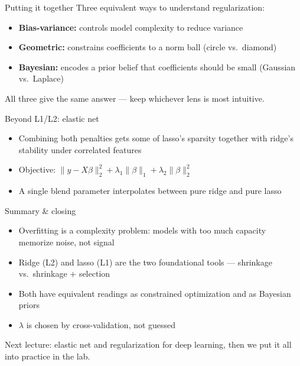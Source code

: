 \documentclass[aspectratio=169, 10pt]{beamer}
\begin{document}
\begin{frame}{Putting it together}
  Three equivalent ways to understand regularization:
  \begin{itemize}
    \item \textbf{Bias-variance:} controls model complexity to reduce variance
    \item \textbf{Geometric:} constrains coefficients to a norm ball (circle vs.\ diamond)
    \item \textbf{Bayesian:} encodes a prior belief that coefficients should be small (Gaussian vs.\ Laplace)
  \end{itemize}
  All three give the same answer --- keep whichever lens is most intuitive.
\end{frame}

\begin{frame}{Beyond L1/L2: elastic net}
  \begin{itemize}
    \item Combining both penalties gets some of lasso's sparsity together with ridge's stability under correlated features
    \item Objective: $\|y - X\beta\|_2^2 + \lambda_1 \|\beta\|_1 + \lambda_2 \|\beta\|_2^2$
    \item A single blend parameter interpolates between pure ridge and pure lasso
  \end{itemize}
\end{frame}

\begin{frame}{Summary \& closing}
  \begin{itemize}
    \item Overfitting is a complexity problem: models with too much capacity memorize noise, not signal
    \item Ridge (L2) and lasso (L1) are the two foundational tools --- shrinkage vs.\ shrinkage + selection
    \item Both have equivalent readings as constrained optimization and as Bayesian priors
    \item $\lambda$ is chosen by cross-validation, not guessed
  \end{itemize}
  \vspace{0.5em}
  Next lecture: elastic net and regularization for deep learning, then we put it all into practice in the lab.
\end{frame}
\end{document}
